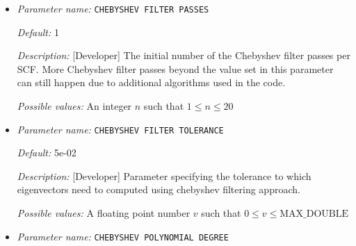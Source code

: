 \begin{itemize}


{\it Default:} 0


{\it Description:} [Developer] Sets the number of OpenMP threads to be used in the blas linear algebra calls inside the Chebyshev filtering. The default value is 0, for which no action is taken. CAUTION: For non zero values, CHEBYSHEV FILTER NUM OMP THREADS takes precedence over the OMP\_NUM\_THREADS environment variable.


{\it Possible values:} An integer $n$ such that $0\leq n \leq 300$
\item {\it Parameter name:} {\tt CHEBYSHEV FILTER PASSES}
\label{parameters:SCF parameters/Eigen_2dsolver_2fChebyshev solver related parameters/CHEBYSHEV FILTER PASSES}
\label{parameters:SCF_20parameters/Eigen_2dsolver_2fChebyshev_20solver_20related_20parameters/CHEBYSHEV_20FILTER_20PASSES}




{\it Default:} 1


{\it Description:} [Developer] The initial number of the Chebyshev filter passes per SCF. More Chebyshev filter passes beyond the value set in this parameter can still happen due to additional algorithms used in the code.


{\it Possible values:} An integer $n$ such that $1\leq n \leq 20$
\item {\it Parameter name:} {\tt CHEBYSHEV FILTER TOLERANCE}
\label{parameters:SCF parameters/Eigen_2dsolver_2fChebyshev solver related parameters/CHEBYSHEV FILTER TOLERANCE}
\label{parameters:SCF_20parameters/Eigen_2dsolver_2fChebyshev_20solver_20related_20parameters/CHEBYSHEV_20FILTER_20TOLERANCE}




{\it Default:} 5e-02


{\it Description:} [Developer] Parameter specifying the tolerance to which eigenvectors need to computed using chebyshev filtering approach.


{\it Possible values:} A floating point number $v$ such that $0 \leq v \leq \text{MAX\_DOUBLE}$
\item {\it Parameter name:} {\tt CHEBYSHEV POLYNOMIAL DEGREE}
\label{parameters:SCF parameters/Eigen_2dsolver_2fChebyshev solver related parameters/CHEBYSHEV POLYNOMIAL DEGREE}
\label{parameters:SCF_20parameters/Eigen_2dsolver_2fChebyshev_20solver_20related_20parameters/CHEBYSHEV_20POLYNOMIAL_20DEGREE}



\end{itemize}
